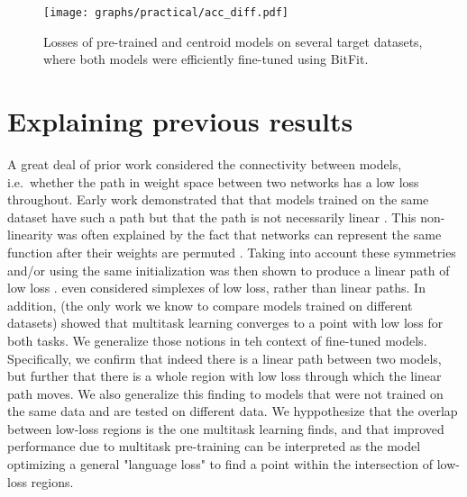 \documentclass[nohyperref]{article}
\theoremstyle{plain}
\theoremstyle{definition}
\theoremstyle{remark}
\begin{document}
\begin{figure}[t]
\centering
    \texttt{[image: graphs/practical/acc\_diff.pdf]}
\caption{Losses of pre-trained and centroid models on several target datasets, where both models were efficiently fine-tuned using BitFit.\label{fig:bitfit}}
\end{figure}

\section{Explaining previous results}\label{sec:related}
A great deal of prior work considered the connectivity between models, i.e.\ whether the path in weight space between two networks has a low loss throughout. Early work demonstrated that that models trained on the same dataset have such a path but that the path is not necessarily linear \citep{garipov2018loss, pmlr-v119-frankle20a}. This non-linearity was often explained by the fact that networks can represent the same function after their weights are permuted \citep{ainsworth2022git,jordan2022repair, 6796044,HECHTNIELSEN1990129}. Taking into account these symmetries and/or using the same initialization was then shown to produce a linear path of low loss \citep{mcmahan2017communication,entezari2021role}. \citet{benton2021loss} even considered simplexes of low loss, rather than linear paths. In addition, \citet{mirzadeh2020linear} (the only work we know to compare models trained on different datasets) showed that multitask learning converges to a point with low loss for both tasks. We generalize those notions in teh context of fine-tuned models. Specifically, we confirm that indeed there is a linear path between two models, but further that there is a whole region with low loss through which the linear path moves. We also generalize this finding to models that were not trained on the same data and are tested on different data. We hyppothesize that the overlap between low-loss regions is the one multitask learning finds, and that improved performance due to multitask pre-training \citep{aghajanyan-etal-2021-muppet} can be interpreted as the model optimizing a general "language loss" to find a point within the intersection of low-loss regions.
\end{document}
